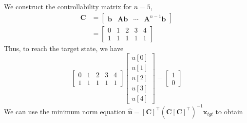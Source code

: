 \documentclass[]{article}
\newcommand{\unit}[1]{\bm{\hat{#1}}}
\newcommand{\tpose}[1]{\left[#1\right]^{\! \top} \!\!}
\begin{document}
We construct the controllability matrix for \(n = 5\),
\begin{align}
	\bm{C} &= \begin{bmatrix}
	\bm{b} & \bm{Ab} & \cdots & \bm{A}^{n - 1} \bm{b}
	\end{bmatrix} \\
	&= \begin{bmatrix}
	0 & 1 & 2 & 3 & 4 \\
	1 & 1 & 1 & 1 & 1
	\end{bmatrix}
\end{align}
Thus, to reach the target state, we have
\begin{equation}
	\begin{bmatrix}
	0 & 1 & 2 & 3 & 4 \\
	1 & 1 & 1 & 1 & 1
	\end{bmatrix} \begin{bmatrix}
	u[0] \\
	u[1] \\
	u[2] \\
	u[3] \\
	u[4]
	\end{bmatrix} =
	\begin{bmatrix}
	1 \\
	0
	\end{bmatrix}
\end{equation}
We can use the minimum norm equation \(\unit{u} = \tpose{\bm{C}} (\bm{C} \tpose{\bm{C}})^{-1} \bm{x}_{tgt}\) to obtain
\end{document}
